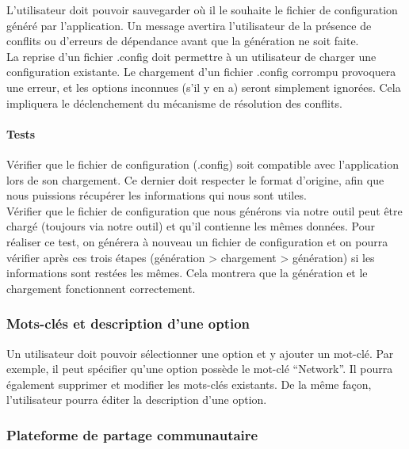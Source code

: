 \documentclass[16pts]{report}
\begin{document}
L’utilisateur doit pouvoir sauvegarder où il le souhaite le fichier de
configuration généré par l’application. Un message avertira l’utilisateur de la
présence de conflits ou d’erreurs de dépendance avant que la génération ne soit
faite.
\\

La reprise d’un fichier .config doit permettre à un utilisateur de charger une
configuration existante. Le chargement d’un fichier .config corrompu provoquera
une erreur, et les options inconnues (s’il y en a) seront simplement ignorées.
Cela impliquera le déclenchement du mécanisme de résolution des conflits.

\paragraph{Tests}
\label{sub:Tests}

Vérifier que le fichier de configuration (.config) soit compatible avec
l’application lors de son chargement. Ce dernier doit respecter le format
d’origine, afin que nous puissions récupérer les informations qui nous sont
utiles.
\\

Vérifier que le fichier de configuration que nous générons via notre outil
peut être chargé (toujours via notre outil) et qu’il contienne les mêmes
données. Pour réaliser ce test, on générera à nouveau un fichier de
configuration et on pourra vérifier après ces trois étapes (génération >
chargement > génération) si les informations sont restées les mêmes. Cela
montrera que la génération et le chargement fonctionnent correctement.


\subsubsection{Mots-clés et description d'une option}
\label{sec:Mots-clés et description d'une option}

Un utilisateur doit pouvoir sélectionner une option et y ajouter un mot-clé.
Par exemple, il peut spécifier qu’une option possède le mot-clé “Network”. Il
pourra également supprimer et modifier les mots-clés existants. De la même
façon, l’utilisateur pourra éditer la description d’une option.

\subsubsection{Plateforme de partage communautaire}
\label{sec:Plateforme de partage communautaire}
\end{document}
